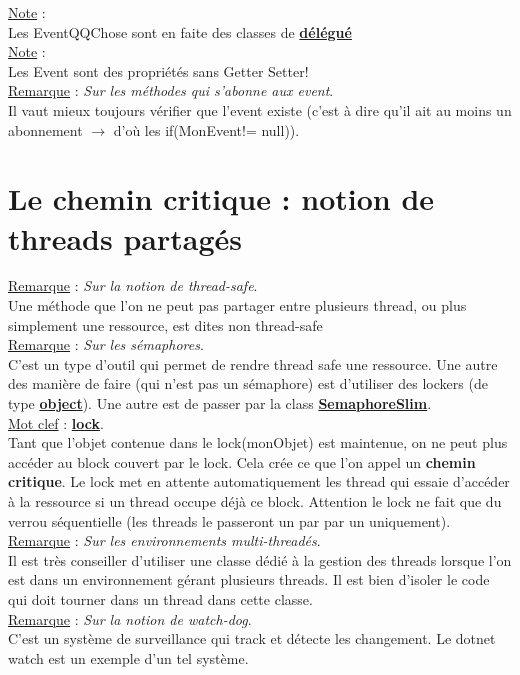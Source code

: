 \documentclass[a4paper,12pt,twoside]{article}
\newcommand{\urlcolor}{magenta}  %
\newcommand{\keycolor}{purple} %
\newcommand{\incode}[1]{{\footnotesize\ttfamily #1}} %
\newcommand{\rem}[2]{\noindent\underline{Remarque} : \textit{#1}.\\ \indent #2}
\newcommand{\note}[1]{\noindent\underline{Note} : \\ \indent #1}
\newcommand{\keyref}[2]{\hypersetup{urlcolor=\keycolor} \href{#1}{\textbf{#2}}\hypersetup{urlcolor=\urlcolor}}
\newcommand{\keyword}[3]{\noindent\underline{Mot clef} : \keyref{#1}{#2}. \\ \indent #3}
\begin{document}
\note{Les EventQQChose sont en faite des classes de \keyref{https://docs.microsoft.com/en-us/dotnet/csharp/programming-guide/delegates/}{délégué}}\\

\note{Les \incode{Event} sont des propriétés sans Getter Setter!}\\

\rem{Sur les méthodes qui s'abonne aux event}{Il vaut mieux toujours vérifier que l'event existe (c'est à dire qu'il ait au moins un abonnement $\to$ d'où les \incode{if(MonEvent!= null)}).}

\section{Le chemin critique : notion de threads partagés}

\rem{Sur la notion de thread-safe}{Une méthode que l'on ne peut pas partager entre plusieurs thread, ou plus simplement une ressource, est dites non thread-safe}\\

\rem{Sur les sémaphores}{C'est un type d'outil qui permet de rendre thread safe une ressource. Une autre des manière de faire (qui n'est pas un sémaphore) est d'utiliser des lockers (de type \keyref{https://docs.microsoft.com/fr-fr/dotnet/api/system.object?view=net-6.0}{object}). Une autre est de passer par la class \keyref{https://docs.microsoft.com/en-us/dotnet/api/system.threading.semaphoreslim?view=net-6.0}{SemaphoreSlim}.}\\

\keyword{https://docs.microsoft.com/en-us/dotnet/csharp/language-reference/statements/lock}{lock}{Tant que l'objet contenue dans le lock(monObjet) est maintenue, on ne peut plus accéder au block couvert par le lock. Cela crée ce que l'on appel un \textbf{chemin critique}. Le lock met en attente automatiquement les thread qui essaie d'accéder à la ressource si un thread occupe déjà ce block. Attention le lock ne fait que du verrou séquentielle (les threads le passeront un par par un uniquement).}\\

\rem{Sur les environnements multi-threadés}{Il est très conseiller d'utiliser une classe dédié à la gestion des threads lorsque l'on est dans un environnement gérant plusieurs threads. Il est bien d'isoler le code qui doit tourner dans un thread dans cette classe.}\\

\rem{Sur la notion de watch-dog}{C'est un système de surveillance qui track et détecte les changement. Le \incode{dotnet watch} est un exemple d'un tel système.}\\
\end{document}
